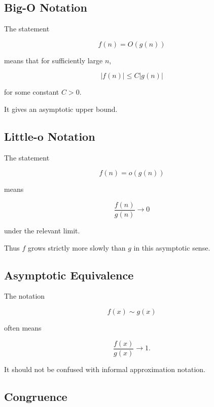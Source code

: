 \subsection{Big-O Notation}
\label{subsec:big-o-reference}

The statement

\[
\boxed{
f(n)=O(g(n))
}
\]

means that for sufficiently large \(n\),

\[
\boxed{
|f(n)|
\leq
C|g(n)|
}
\]

for some constant \(C>0\).

It gives an asymptotic upper bound.

\subsection{Little-o Notation}
\label{subsec:little-o-reference}

The statement

\[
\boxed{
f(n)=o(g(n))
}
\]

means

\[
\boxed{
\frac{f(n)}{g(n)}
\to0
}
\]

under the relevant limit.

Thus \(f\) grows strictly more slowly than \(g\) in this asymptotic sense.

\subsection{Asymptotic Equivalence}
\label{subsec:asymptotic-equivalence-reference}

The notation

\[
\boxed{
f(x)\sim g(x)
}
\]

often means

\[
\boxed{
\frac{f(x)}{g(x)}
\to1.
}
\]

It should not be confused with informal approximation notation.

\subsection{Congruence}
\label{subsec:congruence-symbol-reference}

